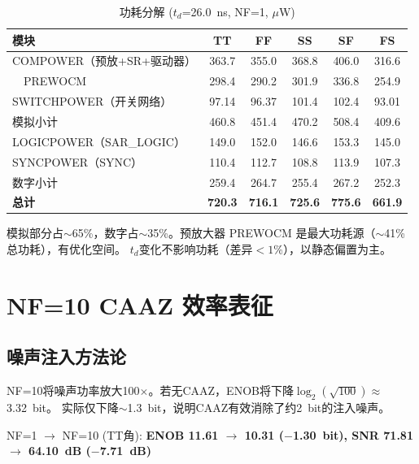 \documentclass[11pt,a4paper,UTF8]{ctexart}
\begin{document}
\begin{table}[htbp]
\centering
\caption{功耗分解 ($t_d$=26.0~ns, NF=1, $\mu$W)}
\label{tab:power-nf1}
\small
\setlength{\tabcolsep}{4pt}
\begin{tabular}{lccccc}
\toprule
\textbf{模块} & \textbf{TT} & \textbf{FF} & \textbf{SS} & \textbf{SF} & \textbf{FS} \\
\midrule
COMPOWER（预放+SR+驱动器） & 363.7 & 355.0 & 368.8 & 406.0 & 316.6 \\
~~PREWOCM & 298.4 & 290.2 & 301.9 & 336.8 & 254.9 \\

SWITCHPOWER（开关网络） & 97.14 & 96.37 & 101.4 & 102.4 & 93.01 \\
\midrule
模拟小计 & 460.8 & 451.4 & 470.2 & 508.4 & 409.6 \\
\midrule
LOGICPOWER（SAR\_LOGIC） & 149.0 & 152.0 & 146.6 & 153.3 & 145.0 \\

SYNCPOWER（SYNC） & 110.4 & 112.7 & 108.8 & 113.9 & 107.3 \\
\midrule
数字小计 & 259.4 & 264.7 & 255.4 & 267.2 & 252.3 \\
\midrule
\textbf{总计} & \textbf{720.3} & \textbf{716.1} & \textbf{725.6} & \textbf{775.6} & \textbf{661.9} \\
\bottomrule
\end{tabular}
\normalsize
\end{table}

模拟部分占$\sim$65\%，数字占$\sim$35\%。预放大器 PREWOCM 是最大功耗源（$\sim$41\%总功耗），有优化空间。
$t_d$变化不影响功耗（差异$<1\%$），以静态偏置为主。

\section{NF=10 CAAZ 效率表征}
\label{sec:nf10}

\subsection{噪声注入方法论}

NF=10将噪声功率放大100$\times$。若无CAAZ，ENOB将下降$\log_2(\sqrt{100})\approx$3.32~bit。
实际仅下降$\sim$1.3~bit，说明CAAZ有效消除了约2~bit的注入噪声。

NF=1 $\rightarrow$ NF=10 (TT角): \textbf{ENOB 11.61 $\rightarrow$ 10.31 ($-$1.30~bit), SNR 71.81 $\rightarrow$ 64.10~dB ($-$7.71~dB)}
\end{document}
